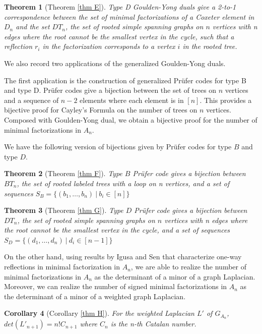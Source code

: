\documentclass[11pt]{amsart}
\newtheorem{thm}{Theorem}[section]
\newtheorem{cor}[thm]{Corollary}%
\begin{document}
\begin{thm}[Theorem \ref{thm E}]
    Type D Goulden-Yong duals give a 2-to-1 correspondence between the set of minimal factorizations of a Coxeter element in $D_n$ and the set $DT_n$, the set of rooted simple spanning graphs on $n$ vertices with n edges where the root cannot be the smallest vertex in the cycle, such that a reflection $r_i$ in the factorization corresponds to a vertex $i$ in the rooted tree.
\end{thm}

We also record two applications of the generalized Goulden-Yong duals.

The first application is the construction of generalized Pr\"{u}fer codes for type B and type D. Pr\"{u}fer codes give a bijection between the set of trees on $n$ vertices and a sequence of $n-2$ elements where each element is in $[n]$. This provides a bijective proof for Cayley's Formula on the number of trees on $n$ vertices. Composed with Goulden-Yong dual, we obtain a bijective proof for the number of minimal factorizations in $A_n$.

We have the following version of bijections given by Pr\"{u}fer codes for type $B$ and type $D$.

\begin{thm}[Theorem \ref{thm F}]
    Type $B$ Pr\"{u}fer code gives a bijection between $BT_n$, the set of rooted labeled trees with a loop on n vertices, and a set of sequences $S_B=\{(b_1,\dots,b_n) \ | \ b_i \in [n]\}$
\end{thm}

\begin{thm}[Theorem \ref{thm G}]
    Type $D$ Pr\"{u}fer code gives a bijection between $DT_n$, the set of  rooted simple spanning graphs on $n$ vertices with n edges where the root cannot be the smallest vertex in the cycle, and a set of sequences $S_D=\{(d_1,\dots,d_n) \ | \ d_i \in [n-1]\}$
\end{thm}

On the other hand, using results by Igusa and Sen that characterize one-way reflections in minimal factorization in $A_n$, we are able to realize the number of minimal factorizations in $A_n$ as the determinant of a minor of a graph Laplacian. Moreover, we can realize the number of signed minimal factorizations in $A_n$ as the determinant of a minor of a weighted graph Laplacian.

\begin{cor}[Corollary \ref{thm H}]
    For the weighted Laplacian $L'$ of $G_{A_n}$, $det(L'_{n+1})=n!C_{n+1}$ where $C_n$ is the n-th Catalan number.
\end{cor}
\end{document}
